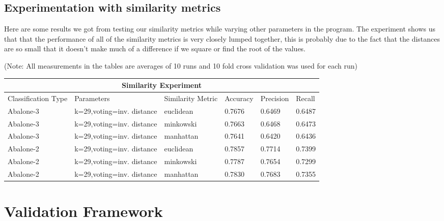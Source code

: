 \subsection{Experimentation with similarity metrics}

Here are some results we got from testing our similarity metrics while varying other parameters in the program. 
The experiment shows us that that the performance of all of the similarity metrics is very closely lumped together, this is probably due to the fact that the distances are so small that it doesn't make much of a difference if we square or find the root of the values. 

(Note: All measurements in the tables are averages of 10 runs and 10 fold cross validation was used for each run)

\begin{tabular}{|p{2cm}|p{3cm}||p{2cm}|p{1.5cm}|p{1.5cm}|p{1.5cm}|     }
 \hline
 \multicolumn{6}{|c|}{Similarity Experiment} \\
 \hline
 Classification Type & Parameters & Similarity Metric & Accuracy & Precision & Recall\\
 \hline
 Abalone-3 & k=29,voting=inv. distance &   euclidean & 0.7676  & 0.6469 & 0.6487\\
 \hline
 Abalone-3 & k=29,voting=inv. distance &   minkowski & 0.7663 & 0.6468 & 0.6473\\
 \hline
 Abalone-3 & k=29,voting=inv. distance &   manhattan & 0.7641 & 0.6420 & 0.6436\\ 
 \hline
 \hline
 Abalone-2 & k=29,voting=inv. distance &   euclidean & 0.7857  & 0.7714 & 0.7399\\
 \hline
 Abalone-2 & k=29,voting=inv. distance &   minkowski & 0.7787 & 0.7654 & 0.7299\\
 \hline
 Abalone-2 & k=29,voting=inv. distance &   manhattan & 0.7830  & 0.7683 & 0.7355\\ 
 \hline
 
\end{tabular}




\section{Validation Framework}

